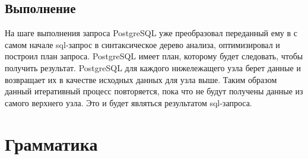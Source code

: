 \begin{figure}[ht!]
\end{figure}

\newpage

\subsection{Выполнение}

На шаге выполнения запроса PostgreSQL уже преобразовал переданный ему в с самом начале 
sql-запрос в синтаксическое дерево анализа, оптимизировал и построил план запроса.
PostgreSQL имеет план, которому будет следовать, чтобы получить результат.
PostgreSQL для каждого нижележащего узла берет данные и возвращает их 
в качестве исходных данных для узла выше. 
Таким образом данный итеративный процесс повторяется,
пока что не будут получены данные из самого верхнего узла.
Это и будет являться результатом sql-запроса.

\section{Грамматика}


